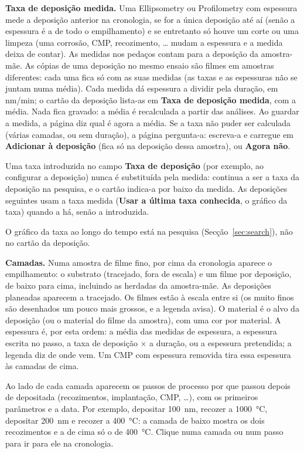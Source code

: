 \documentclass[11pt,a4paper]{article}
\newcommand{\ui}[1]{\textsf{\textbf{#1}}}
\begin{document}
\textbf{Taxa de deposição medida.} Uma Ellipsometry ou Profilometry com
espessura mede a deposição anterior na cronologia, se for a única deposição
até aí (senão a espessura é a de todo o empilhamento) e se entretanto só houve
um corte ou uma limpeza (uma corrosão, CMP, recozimento, \ldots{} mudam a
espessura e a medida deixa de contar). As medidas nos pedaços contam para a
deposição da amostra-mãe. As cópias de uma deposição no mesmo ensaio são
filmes em amostras diferentes: cada uma fica só com as suas medidas (as taxas e
as espessuras não se juntam numa média). Cada medida dá espessura a dividir pela duração, em nm/min; o cartão
da deposição lista-as em \ui{Taxa de deposição medida}, com a média. Nada fica
gravado: a média é recalculada a partir das análises. Ao guardar a medida, a
página diz qual é agora a média. Se a taxa não puder ser calculada (várias
camadas, ou sem duração), a página pergunta-a: escreva-a e carregue em
\ui{Adicionar à deposição} (fica só na deposição dessa amostra), ou
\ui{Agora não}.

Uma taxa introduzida no campo \ui{Taxa de deposição} (por exemplo, ao
configurar a deposição) nunca é substituída pela medida: continua a ser a
taxa da deposição na pesquisa, e o cartão indica-a por baixo da medida. As
deposições seguintes usam a taxa medida (\ui{Usar a última taxa conhecida}, o
gráfico da taxa) quando a há, senão a introduzida.

O gráfico da taxa ao longo do tempo está na pesquisa (Secção~\ref{sec:search}),
não no cartão da deposição.

\textbf{Camadas.} Numa amostra de filme fino, por cima da cronologia aparece o
empilhamento: o substrato (tracejado, fora de escala) e um filme por
deposição, de baixo para cima, incluindo as herdadas da amostra-mãe. As
deposições planeadas aparecem a tracejado. Os filmes estão à escala entre si
(os muito finos são desenhados um pouco mais grossos, e a legenda avisa).
O material é o alvo da deposição (ou o material do filme da amostra), com uma
cor por material. A espessura é, por esta ordem: a média das medidas de
espessura, a espessura escrita no passo, a taxa de deposição × a duração, ou
a espessura pretendida; a legenda diz de onde vem. Um CMP com espessura
removida tira essa espessura às camadas de cima.

Ao lado de cada camada aparecem os passos de processo por que passou depois
de depositada (recozimentos, implantação, CMP, \ldots), com os primeiros
parâmetros e a data. Por exemplo, depositar 100~nm, recozer a 1000~°C,
depositar 200~nm e recozer a 400~°C: a camada de baixo mostra os dois
recozimentos e a de cima só o de 400~°C. Clique numa camada ou num passo para
ir para ele na cronologia.
\end{document}
